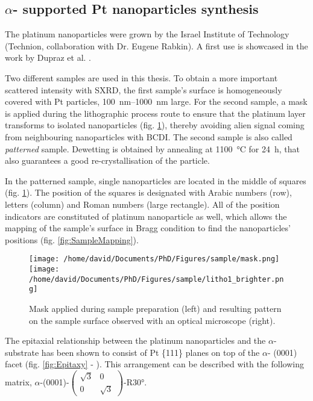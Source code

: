 \subsection{$\alpha$- supported Pt nanoparticles synthesis}\label{sec:PtParticles}

The platinum nanoparticles were grown by the Israel Institute of Technology (Technion, collaboration with Dr. Eugene Rabkin).
A first use is showcased in the work by Dupraz et al. \parencite*{Dupraz2017}.

Two different samples are used in this thesis.
To obtain a more important scattered intensity with SXRD, the first sample's surface is homogeneously covered with Pt particles, \qtyrange{100}{1000}{\nm} large.
For the second sample, a mask is applied during the lithographic process route to ensure that the platinum layer transforms to isolated nanoparticles (fig. \ref{fig:Mask}), thereby avoiding alien signal coming from neighbouring nanoparticles with BCDI.
The second sample is also called \textit{patterned} sample.
Dewetting is obtained by annealing at \qty{1100}{\degreeCelsius} for \qty{24}{\hour}, that also guarantees a good re-crystallisation of the particle.

In the patterned sample, single nanoparticles are located in the middle of squares (fig. \ref{fig:Mask}).
The position of the squares is designated with Arabic numbers (row), letters (column) and Roman numbers (large rectangle).
All of the position indicators are constituted of platinum nanoparticle as well, which allows the mapping of the sample's surface in Bragg condition to find the nanoparticles' positions (fig. \ref{fig:SampleMapping}).

\begin{figure}[!htb]
    \centering
    \texttt{[image: /home/david/Documents/PhD/Figures/sample/mask.png]}
    \texttt{[image: /home/david/Documents/PhD/Figures/sample/litho1\_brighter.png]}
    \caption{
        Mask applied during sample preparation (left) and resulting pattern on the sample surface observed with an optical microscope (right).
    }
    \label{fig:Mask}
\end{figure}

The epitaxial relationship between the platinum nanoparticles and the $\alpha$- substrate has been shown to consist of Pt \{111\} planes on top of the $\alpha$- (0001) facet (fig. \ref{fig:Epitaxy} - \cite{Farrow1993}).
This arrangement can be described with the following matrix, $\alpha$-(0001)-$\begin{pmatrix} \sqrt{3} & 0\\ 0 & \sqrt{3} \end{pmatrix}$-R\ang{30}.

